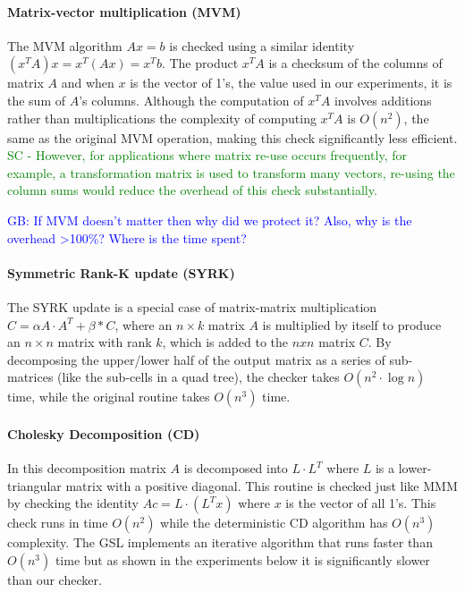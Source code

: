\documentclass{sig-alternate}
\newcommand{\sui}[1]{%
  \textcolor{green}{SC - #1}
}
\newcommand{\greg}[1]{%
  \textcolor{blue}{GB: #1}
}
\begin{document}
\paragraph{Matrix-vector multiplication (MVM)}
The MVM algorithm $Ax=b$ is checked using a similar identity $(x^TA)x = x^T(Ax) = x^Tb$.
The product $x^TA$ is a checksum of the columns of matrix $A$ and when $x$ is the vector of 1's, the value used in our experiments, it is the sum of $A$'s columns.
Although the computation of $x^TA$ involves additions rather than multiplications the complexity of computing $x^TA$ is $O(n^2)$, the same as the original MVM operation, making this check significantly less efficient.
\sui{However, for applications where matrix re-use occurs frequently, for example, a transformation matrix is used to transform many vectors, re-using the column sums would reduce the overhead of this check substantially.}

\greg{If MVM doesn't matter then why did we protect it? Also, why is the overhead >100\%? Where is the time spent?}

\paragraph{Symmetric Rank-K update (SYRK)}
The SYRK update is a special case of matrix-matrix multiplication $C = \alpha A \cdot A^T + \beta*C$, where an $n \times k$ matrix $A$ is multiplied by itself to produce an $n \times n$ matrix with rank $k$, which is added to the $nxn$ matrix $C$.
By decomposing the upper/lower half of the output matrix as a series of sub-matrices (like the sub-cells in a quad tree), the checker takes $O(n^2 \cdot \log{n})$ time, while the original routine takes $O(n^3)$ time.

\paragraph{Cholesky Decomposition (CD)}
In this decomposition matrix $A$ is decomposed into $L \cdot L^T$ where $L$ is a lower-triangular matrix with a positive diagonal.
This routine is checked just like MMM by checking the identity $Ac = L \cdot (L^T x)$ where $x$ is the vector of all 1's.
This check runs in time $O(n^2)$ while the deterministic CD algorithm has $O(n^3)$ complexity.
The GSL implements an iterative algorithm that runs faster than $O(n^3)$ time but as shown in the experiments below it is significantly slower than our checker.
\end{document}
